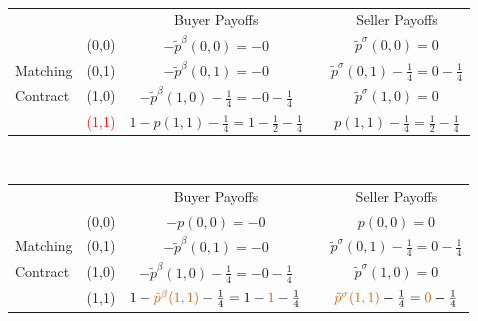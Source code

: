 \documentclass[12pt,letterpaper]{article}           %
\begin{document}
$ $

\newpage


\begin{table}[]
	\begin{tabular}{lcccc}
		&                            & Buyer Payoffs         &                       & Seller Payoffs        \\ \cline{3-3} \cline{5-5} 
& \multicolumn{1}{c|}{(0,0)} & \multicolumn{1}{c|}{$-\tilde{p}^\beta(0,0)= -0$} & \multicolumn{1}{c|}{} & \multicolumn{1}{c|}{$\tilde{p}^\sigma(0,0)=  0$} \\ \cline{3-3} \cline{5-5} 
Matching & \multicolumn{1}{c|}{(0,1)} & \multicolumn{1}{c|}{$-\tilde{p}^\beta(0,1)= -0$} & \multicolumn{1}{c|}{} & \multicolumn{1}{c|}{$\tilde{p}^\sigma(0,1) -\frac{1}{4}= 0 -\frac{1}{4}$}  \\ \cline{3-3} \cline{5-5} 
Contract& \multicolumn{1}{c|}{(1,0)} & \multicolumn{1}{c|}{$ -\tilde{p}^\beta(1,0) - \frac{1}{4}= - 0 - \frac{1}{4}$} & \multicolumn{1}{c|}{} & \multicolumn{1}{c|}{$\tilde{p}^\sigma(1,0)=  0$} \\ \cline{3-3} \cline{5-5} 
		& \multicolumn{1}{c|}{\textcolor{red}{(1,1)}} & \multicolumn{1}{c|}{$  1 -p(1,1) - \frac{1}{4} = 1 - \frac{1}{2}- \frac{1}{4}$} & \multicolumn{1}{c|}{} & \multicolumn{1}{c|}{$ p(1,1) - \frac{1}{4}= \frac{1}{2}- \frac{1}{4}$} \\ \cline{3-3} \cline{5-5} 
	\end{tabular}
\end{table}


$ $

\newpage


\begin{table}[]
	\begin{tabular}{lcccc}
		&                            & Buyer Payoffs         &                       & Seller Payoffs        \\ \cline{3-3} \cline{5-5} 
& \multicolumn{1}{c|}{(0,0)} & \multicolumn{1}{c|}{$-p(0,0)= -0$} & \multicolumn{1}{c|}{} & \multicolumn{1}{c|}{$p(0,0)=  0$} \\ \cline{3-3} \cline{5-5} 
Matching & \multicolumn{1}{c|}{(0,1)} & \multicolumn{1}{c|}{$-\tilde{p}^\beta(0,1)= -0$} & \multicolumn{1}{c|}{} & \multicolumn{1}{c|}{$\tilde{p}^\sigma(0,1) -\frac{1}{4}= 0 -\frac{1}{4}$}  \\ \cline{3-3} \cline{5-5} 
Contract& \multicolumn{1}{c|}{(1,0)} & \multicolumn{1}{c|}{$ -\tilde{p}^\beta(1,0) - \frac{1}{4}= - 0 - \frac{1}{4}$} & \multicolumn{1}{c|}{} & \multicolumn{1}{c|}{$\tilde{p}^\sigma(1,0)=  0$} \\ \cline{3-3} \cline{5-5}  
		& \multicolumn{1}{c|}{(1,1)} & \multicolumn{1}{c|}{$1 -\textcolor{red}{\tilde{p}^\beta(1,1)} - \frac{1}{4}= 1 - \textcolor{red}{1} - \frac{1}{4}$} & \multicolumn{1}{c|}{} & \multicolumn{1}{c|}{$ \textcolor{red}{\tilde{p}^\sigma(1,1)} - \frac{1}{4}=\textcolor{red}{0} - \frac{1}{4}$} \\ \cline{3-3} \cline{5-5} 
	\end{tabular}
\end{table}
\end{document}
